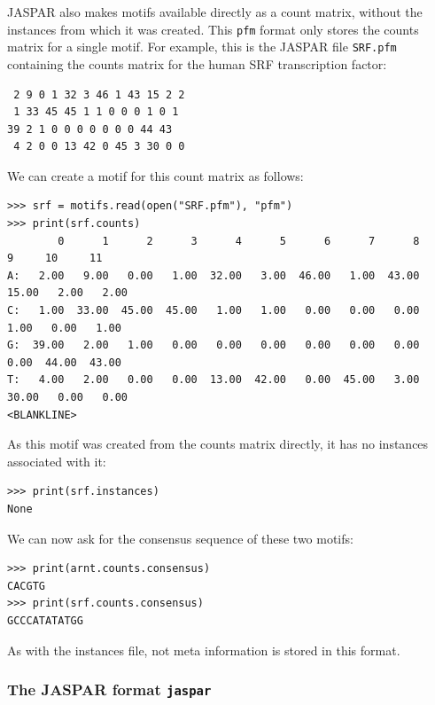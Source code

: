 \documentclass{report}
\begin{document}
JASPAR also makes motifs available directly as a count matrix,
without the instances from which it was created. This \verb+pfm+ format only
stores the counts matrix for a single motif.
For example, this is the JASPAR file \verb+SRF.pfm+ containing the counts matrix for the human SRF transcription factor:
\begin{verbatim}
 2 9 0 1 32 3 46 1 43 15 2 2
 1 33 45 45 1 1 0 0 0 1 0 1
39 2 1 0 0 0 0 0 0 0 44 43
 4 2 0 0 13 42 0 45 3 30 0 0
\end{verbatim}
We can create a motif for this count matrix as follows:
\begin{verbatim}
>>> srf = motifs.read(open("SRF.pfm"), "pfm")
>>> print(srf.counts)
        0      1      2      3      4      5      6      7      8      9     10     11
A:   2.00   9.00   0.00   1.00  32.00   3.00  46.00   1.00  43.00  15.00   2.00   2.00
C:   1.00  33.00  45.00  45.00   1.00   1.00   0.00   0.00   0.00   1.00   0.00   1.00
G:  39.00   2.00   1.00   0.00   0.00   0.00   0.00   0.00   0.00   0.00  44.00  43.00
T:   4.00   2.00   0.00   0.00  13.00  42.00   0.00  45.00   3.00  30.00   0.00   0.00
<BLANKLINE>
\end{verbatim}
As this motif was created from the counts matrix directly, it has no instances associated with it:
\begin{verbatim}
>>> print(srf.instances)
None
\end{verbatim}
We can now ask for the consensus sequence of these two motifs:
\begin{verbatim}
>>> print(arnt.counts.consensus)
CACGTG
>>> print(srf.counts.consensus)
GCCCATATATGG
\end{verbatim}

As with the instances file, not meta information is stored in this format.

\subsubsection*{The JASPAR format \texttt{jaspar}}
\end{document}
